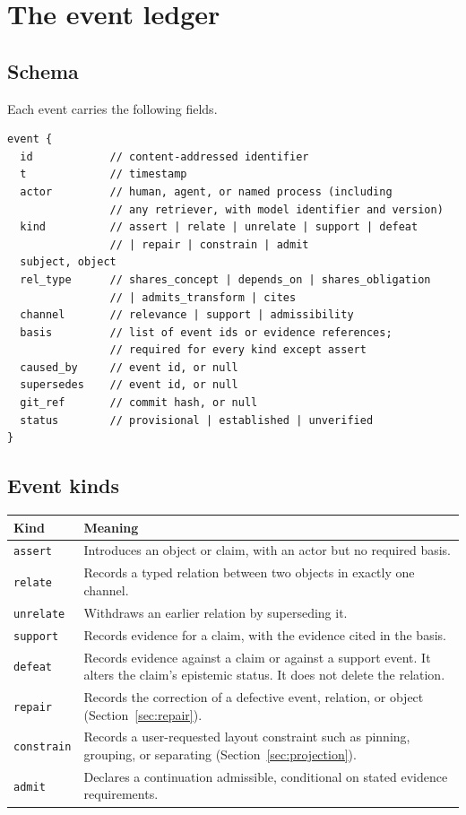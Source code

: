 \documentclass[11pt]{article}
\theoremstyle{definition}
\newcommand{\ev}[1]{\texttt{#1}}
\begin{document}
\section{The event ledger}

\subsection{Schema}

Each event carries the following fields.

\begin{verbatim}
event {
  id            // content-addressed identifier
  t             // timestamp
  actor         // human, agent, or named process (including
                // any retriever, with model identifier and version)
  kind          // assert | relate | unrelate | support | defeat
                // | repair | constrain | admit
  subject, object
  rel_type      // shares_concept | depends_on | shares_obligation
                // | admits_transform | cites
  channel       // relevance | support | admissibility
  basis         // list of event ids or evidence references;
                // required for every kind except assert
  caused_by     // event id, or null
  supersedes    // event id, or null
  git_ref       // commit hash, or null
  status        // provisional | established | unverified
}
\end{verbatim}

\subsection{Event kinds}

\begin{table}[h]
\centering
\small
\begin{tabular}{@{}p{2.2cm}p{10.9cm}@{}}
\toprule
Kind & Meaning\\
\midrule
\ev{assert} & Introduces an object or claim, with an actor but no required basis.\\
\ev{relate} & Records a typed relation between two objects in exactly one channel.\\
\ev{unrelate} & Withdraws an earlier relation by superseding it.\\
\ev{support} & Records evidence for a claim, with the evidence cited in the basis.\\
\ev{defeat} & Records evidence against a claim or against a support event. It alters the claim's epistemic status. It does not delete the relation.\\
\ev{repair} & Records the correction of a defective event, relation, or object (Section~\ref{sec:repair}).\\
\ev{constrain} & Records a user-requested layout constraint such as pinning, grouping, or separating (Section~\ref{sec:projection}).\\
\ev{admit} & Declares a continuation admissible, conditional on stated evidence requirements.\\
\bottomrule
\end{tabular}
\end{table}
\end{document}
